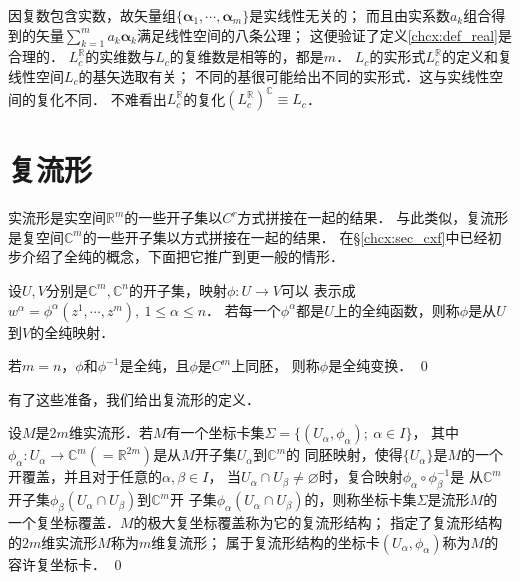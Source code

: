 因复数包含实数，故矢量组$\{\boldsymbol{\alpha}_1,\cdots,\boldsymbol{\alpha}_m\}$是实线性无关的；
而且由实系数$a_k$组合得到的矢量$\sum_{k=1}^{m} a_k \boldsymbol{\alpha}_k$满足线性空间的八条公理；
这便验证了定义\ref{chcx:def_real}是合理的．
$L^{\mathbb{R}}_c$的{\kaishu 实维数}与$L_c$的{\kaishu 复维数}是相等的，都是$m$．
$L_c$的实形式$L^{\mathbb{R}}_c$的定义和复线性空间$L_c$的基矢选取有关；
不同的基很可能给出不同的实形式．这与实线性空间的复化不同．
不难看出$L^{\mathbb{R}}_c$的复化$(L^{\mathbb{R}}_c)^{\mathbb{C}} \equiv L_c$．










\section{复流形}\label{chcx:sec_cxmanifold}
实流形是实空间$\mathbb{R}^m$的一些开子集以$C^r$方式拼接在一起的结果．
与此类似，复流形是复空间$\mathbb{C}^m$的一些开子集以方式拼接在一起的结果．
在\S\ref{chcx:sec_cxf}中已经初步介绍了全纯的概念，下面把它推广到更一般的情形．



\begin{definition}
    设$U,V$分别是$\mathbb{C}^m,\mathbb{C}^n$的开子集，映射$\phi:U\to V$可以
    表示成$w^\alpha=\phi^\alpha(z^1,\cdots,z^m),\ 1\leqslant \alpha \leqslant n$．
    若每一个$\phi^\alpha$都是$U$上的全纯函数，则称$\phi$是从$U$到$V$的{\heiti 全纯映射}．
    
    若$m=n$，$\phi$和$\phi^{-1}$是全纯，且$\phi$是$C^m$上同胚，
    则称$\phi$是{\heiti 全纯变换}．  \qed
\end{definition}

有了这些准备，我们给出复流形的定义．
\begin{definition}\label{chcx:def_cxmanifold}
    设$M$是$2m$维实流形．若$M$有一个坐标卡集$\Sigma=\{(U_\alpha,\phi_\alpha);\ \alpha\in I\}$，
    其中$\phi_\alpha: U_\alpha \to \mathbb{C}^m(=\mathbb{R}^{2m})$是从$M$开子集$U_\alpha$到$\mathbb{C}^m$的
    同胚映射，使得$\{U_\alpha\}$是$M$的一个开覆盖，并且对于任意的$\alpha,\beta\in I$，
    当$U_\alpha \cap U_\beta \neq \varnothing$时，复合映射$\phi_\alpha \circ \phi^{-1}_\beta$是
    从$\mathbb{C}^m$开子集$\phi_\beta(U_\alpha \cap U_\beta)$到$\mathbb{C}^m$开
    子集$\phi_\alpha(U_\alpha \cap U_\beta)$的，则称坐标卡集$\Sigma$是流形$M$的
    一个{\heiti 复坐标覆盖}．$M$的极大复坐标覆盖称为它的{\heiti 复流形结构}；
    指定了复流形结构的$2m$维实流形$M$称为$m$维{\heiti 复流形}；
    属于复流形结构的坐标卡$(U_\alpha,\phi_\alpha)$称为$M$的{\heiti 容许复坐标卡}． \qed
\end{definition}

